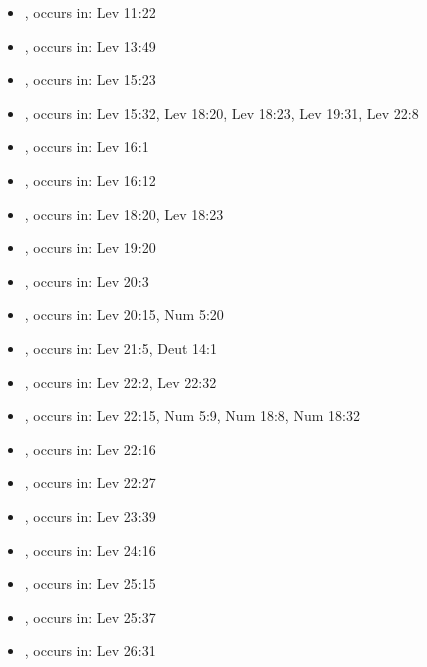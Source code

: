 \documentclass[14pt]{article}
\begin{document}
\begin{itemize}
\item {}, occurs in: Lev 11:22

\item {}, occurs in: Lev 13:49

\item {}, occurs in: Lev 15:23

\item {}, occurs in: Lev 15:32, Lev 18:20, Lev 18:23, Lev 19:31, Lev 22:8

\item {}, occurs in: Lev 16:1

\item {}, occurs in: Lev 16:12

\item {}, occurs in: Lev 18:20, Lev 18:23

\item {}, occurs in: Lev 19:20

\item {}, occurs in: Lev 20:3

\item {}, occurs in: Lev 20:15, Num 5:20

\item {}, occurs in: Lev 21:5, Deut 14:1

\item {}, occurs in: Lev 22:2, Lev 22:32

\item {}, occurs in: Lev 22:15, Num 5:9, Num 18:8, Num 18:32

\item {}, occurs in: Lev 22:16

\item {}, occurs in: Lev 22:27

\item {}, occurs in: Lev 23:39

\item {}, occurs in: Lev 24:16

\item {}, occurs in: Lev 25:15

\item {}, occurs in: Lev 25:37

\item {}, occurs in: Lev 26:31


\end{itemize}
\end{document}
